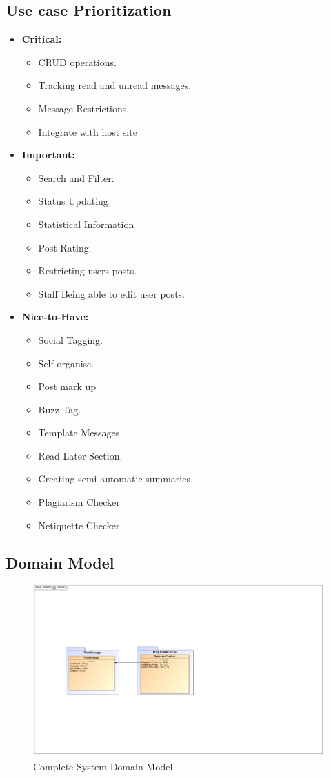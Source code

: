 \documentclass[11pt]{article}
\begin{document}
\subsection{Use case Prioritization}
\begin{itemize}
\item \textbf{Critical: }
	\begin{itemize}
		\item CRUD operations.
		\item Tracking read and unread messages.
		\item Message Restrictions.
		\item Integrate with host site
	\end{itemize}

\item \textbf{Important: }
	\begin{itemize}
		\item Search and Filter.
		\item Status Updating
		\item Statistical Information
		\item Post Rating.
		\item Restricting users posts.
		\item Staff Being able to edit user posts.
	\end{itemize}

\item \textbf{Nice-to-Have: }
	\begin{itemize}
		\item Social Tagging.
		\item Self organise.
		\item Post mark up
		\item Buzz Tag.
		\item Template Messages 
		\item Read Later Section.
		\item Creating semi-automatic summaries.
		\item Plagiarism Checker
		\item Netiquette Checker
	\end{itemize}
\end{itemize}
\newpage
\subsection{Domain Model}
\graphicspath{ {../Diagrams/} }
	  \begin{figure}[H]	
    	\includegraphics[scale=0.32,center]{Domain.jpg}
    	\caption{Complete System Domain Model}
	\end{figure}
\end{document}
